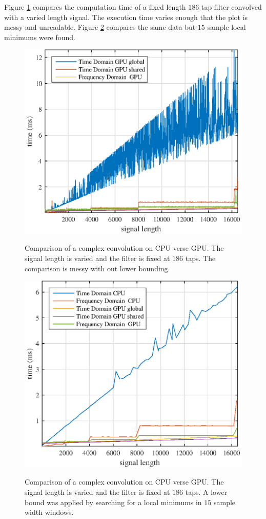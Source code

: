 Figure \ref{fig:CPUvsGPU_1batch_186taps_varySignal_noMin} compares the computation time of a fixed length $186$ tap filter convolved with a varied length signal.
The execution time varies enough that the plot is messy and unreadable.
Figure \ref{fig:CPUvsGPU_1batch_186taps_varySignal} compares the same data but $15$ sample local minimums were found.
\begin{figure}
	\caption{Comparison of a complex convolution on CPU verse GPU. The signal length is varied and the filter is fixed at $186$ taps. The comparison is messy with out lower bounding.}
	\centering\includegraphics[width=5in]{figures/gpu_intro/CPUvsGPU_1batch_186taps_varySignal_noMin.eps}
	\label{fig:CPUvsGPU_1batch_186taps_varySignal_noMin}
\end{figure}
\begin{figure}
	\caption{Comparison of a complex convolution on CPU verse GPU. The signal length is varied and the filter is fixed at $186$ taps. A lower bound was applied by searching for a local minimums in $15$ sample width windows.}
	\centering\includegraphics[width=5in]{figures/gpu_intro/CPUvsGPU_1batch_186taps_varySignal.eps}
	\label{fig:CPUvsGPU_1batch_186taps_varySignal}
\end{figure}

